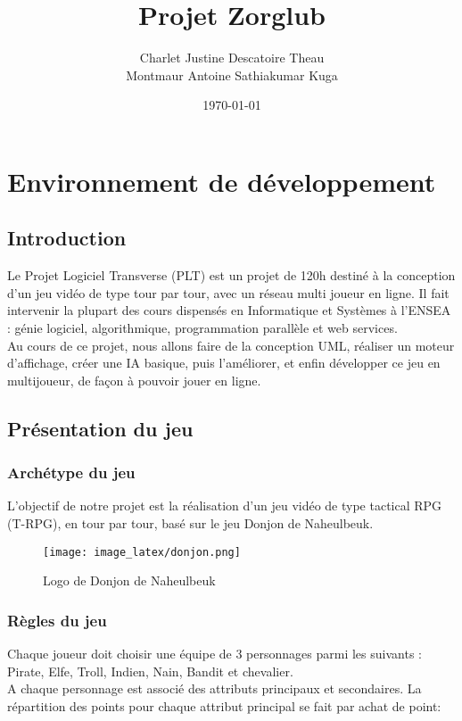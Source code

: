 \documentclass[a4paper,12pt]{report}
\title{Projet Zorglub}
\author{Charlet Justine Descatoire Theau \\ Montmaur Antoine  Sathiakumar Kuga}
\date{\today}
\begin{document}
	\maketitle
	\tableofcontents
	
	\chapter{Environnement de développement}
	\section{Introduction}
	Le Projet Logiciel Transverse (PLT) est un projet de 120h destiné à la conception d'un jeu vidéo de type tour par tour, avec un réseau multi joueur en ligne. Il fait intervenir la plupart des cours dispensés en Informatique et Systèmes à l'ENSEA : génie logiciel, algorithmique, programmation parallèle et web services. \\
	\indent Au cours de ce projet, nous allons faire de la conception UML, réaliser un moteur d'affichage, créer une IA basique, puis l'améliorer, et enfin développer ce jeu en multijoueur, de façon à pouvoir jouer en ligne.
	
	\section{Présentation du jeu}
	
	\subsection{Archétype du jeu}
	L'objectif de notre projet est la réalisation d'un jeu vidéo de type tactical RPG (T-RPG), en tour par tour, basé sur le jeu Donjon de Naheulbeuk. 
	
	\begin{figure}[h]
		\centering
		\texttt{[image: image\_latex/donjon.png]}
		\caption{Logo de Donjon de Naheulbeuk}
	\end{figure}
	
	
	
	\subsection{Règles du jeu}
	Chaque joueur doit choisir une équipe de 3 personnages parmi les suivants : Pirate, Elfe, Troll, Indien, Nain, Bandit et chevalier. \\
	
	
	\indent A chaque personnage est associé des attributs principaux et secondaires. La répartition des points pour chaque attribut principal se fait par achat de point: 
\end{document}
